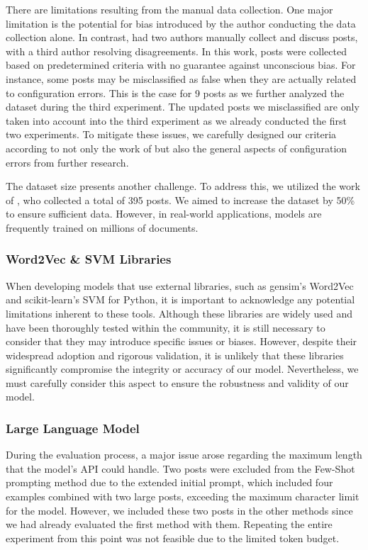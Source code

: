 \documentclass[english,bachelor]{swsLeipzig}
\begin{document}
There are limitations resulting from the manual data collection. One major limitation is the potential for bias introduced by the author conducting the data collection alone. In contrast, \citet{tian:2020} had two authors manually collect and discuss posts, with a third author resolving disagreements. In this work, posts were collected based on predetermined criteria with no guarantee against unconscious bias. For instance, some posts may be misclassified as false when they are actually related to configuration errors. This is the case for 9 posts as we further analyzed the dataset during the third experiment. The updated posts we misclassified are only taken into account into the third experiment as we already conducted the first two experiments. To mitigate these issues, we carefully designed our criteria according to not only the work of \citet{tian:2020} but also the general aspects of configuration errors from further research.

The dataset size presents another challenge. To address this, we utilized the work of \citet{tian:2020}, who collected a total of 395 posts. We aimed to increase the dataset by 50\% to ensure sufficient data. However, in real-world applications, models are frequently trained on millions of documents. 

\subsubsection{Word2Vec \& SVM Libraries}

When developing models that use external libraries, such as gensim's Word2Vec and scikit-learn's SVM for Python, it is important to acknowledge any potential limitations inherent to these tools. Although these libraries are widely used and have been thoroughly tested within the community, it is still necessary to consider that they may introduce specific issues or biases. However, despite their widespread adoption and rigorous validation, it is unlikely that these libraries significantly compromise the integrity or accuracy of our model. Nevertheless, we must carefully consider this aspect to ensure the robustness and validity of our model.

\subsubsection{Large Language Model}

During the evaluation process, a major issue arose regarding the maximum length that the model's API 
could handle. Two posts were excluded from the Few-Shot prompting method due to the extended initial prompt, which included four examples combined with two large posts, exceeding the maximum character limit for the model. However, we included these two posts in the other methods since we had already evaluated the first method with them. Repeating the entire experiment from this point was not feasible due to the limited token budget.
\end{document}
